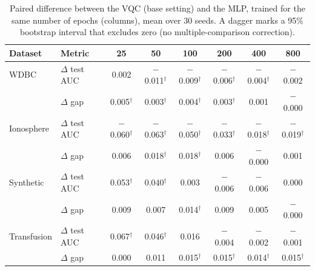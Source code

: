 \begin{table}[t]
\centering
\caption{Paired difference between the VQC (base setting) and the MLP, trained for the same number of epochs (columns), mean over 30 seeds. A dagger marks a 95\% bootstrap interval that excludes zero (no multiple-comparison correction).}
\label{tab:h5}
\footnotesize
\setlength{\tabcolsep}{2.5pt}
\begin{tabular}{llcccccc}
\hline
Dataset & Metric & 25 & 50 & 100 & 200 & 400 & 800 \\
\hline
WDBC & $\Delta$ test AUC & 0.002 & $-$0.011$^{\dagger}$ & $-$0.009$^{\dagger}$ & $-$0.006$^{\dagger}$ & $-$0.004$^{\dagger}$ & $-$0.002 \\
 & $\Delta$ gap & 0.005$^{\dagger}$ & 0.003$^{\dagger}$ & 0.004$^{\dagger}$ & 0.003$^{\dagger}$ & 0.001 & $-$0.000 \\
Ionosphere & $\Delta$ test AUC & $-$0.060$^{\dagger}$ & $-$0.063$^{\dagger}$ & $-$0.050$^{\dagger}$ & $-$0.033$^{\dagger}$ & $-$0.018$^{\dagger}$ & $-$0.019$^{\dagger}$ \\
 & $\Delta$ gap & 0.006 & 0.018$^{\dagger}$ & 0.018$^{\dagger}$ & 0.006 & $-$0.000 & 0.001 \\
Synthetic & $\Delta$ test AUC & 0.053$^{\dagger}$ & 0.040$^{\dagger}$ & 0.003 & $-$0.006 & $-$0.006 & 0.000 \\
 & $\Delta$ gap & 0.009 & 0.007 & 0.014$^{\dagger}$ & 0.009 & 0.005 & $-$0.000 \\
Transfusion & $\Delta$ test AUC & 0.067$^{\dagger}$ & 0.046$^{\dagger}$ & 0.016 & $-$0.004 & $-$0.002 & $-$0.001 \\
 & $\Delta$ gap & 0.000 & 0.011 & 0.015$^{\dagger}$ & 0.015$^{\dagger}$ & 0.014$^{\dagger}$ & 0.015$^{\dagger}$ \\
\hline
\end{tabular}
\end{table}
